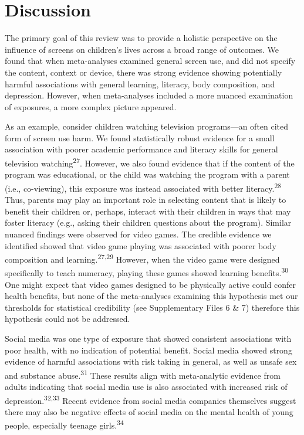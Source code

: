 \documentclass[
  english,
  man]{apa6}
\begin{document}
\hypertarget{discussion}{%
\section{Discussion}\label{discussion}}

The primary goal of this review was to provide a holistic perspective on the influence of screens on children's lives across a broad range of outcomes.
We found that when meta-analyses examined general screen use, and did not specify the content, context or device, there was strong evidence showing potentially harmful associations with general learning, literacy, body composition, and depression.
However, when meta-analyses included a more nuanced examination of exposures, a more complex picture appeared.

As an example, consider children watching television programs---an often cited form of screen use harm.
We found statistically robust evidence for a small association with poorer academic performance and literacy skills for general television watching\textsuperscript{27}.
However, we also found evidence that if the content of the program was educational, or the child was watching the program with a parent (i.e., co-viewing), this exposure was instead associated with better literacy.\textsuperscript{28}
Thus, parents may play an important role in selecting content that is likely to benefit their children or, perhaps, interact with their children in ways that may foster literacy (e.g., asking their children questions about the program).
Similar nuanced findings were observed for video games.
The credible evidence we identified showed that video game playing was associated with poorer body composition and learning.\textsuperscript{27,29}
However, when the video game were designed specifically to teach numeracy, playing these games showed learning benefits.\textsuperscript{30}
One might expect that video games designed to be physically active could confer health benefits, but none of the meta-analyses examining this hypothesis met our thresholds for statistical credibility (see Supplementary Files 6 \& 7) therefore this hypothesis could not be addressed.

Social media was one type of exposure that showed consistent associations with poor health, with no indication of potential benefit.
Social media showed strong evidence of harmful associations with risk taking in general, as well as unsafe sex and substance abuse.\textsuperscript{31}
These results align with meta-analytic evidence from adults indicating that social media use is also associated with increased risk of depression.\textsuperscript{32,33}
Recent evidence from social media companies themselves suggest there may also be negative effects of social media on the mental health of young people, especially teenage girls.\textsuperscript{34}
\end{document}
